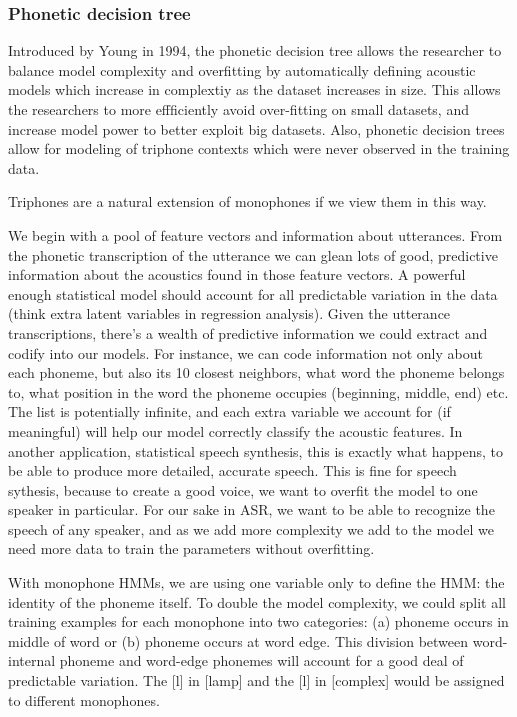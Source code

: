 \documentclass[10pt,a4paper]{article}
\begin{document}
\subsubsection*{Phonetic decision tree}
      
Introduced by Young in 1994, the phonetic decision tree allows the researcher to balance model complexity and overfitting by automatically defining acoustic models which increase in complextiy as the dataset increases in size. This allows the researchers to more effficiently avoid over-fitting on small datasets, and increase model power to better exploit big datasets. Also, phonetic decision trees allow for modeling of triphone contexts which were never observed in the training data.
    
Triphones are a natural extension of monophones if we view them in this way.

We begin with a pool of feature vectors and information about utterances. From the phonetic transcription of the utterance we can glean lots of good, predictive information about the acoustics found in those feature vectors. A powerful enough statistical model should account for all predictable variation in the data (think extra latent variables in regression analysis). Given the utterance transcriptions, there's a wealth of predictive information we could extract and codify into our models. For instance, we can code information not only about each phoneme, but also its 10 closest neighbors, what word the phoneme belongs to, what position in the word the phoneme occupies (beginning, middle, end) etc. The list is potentially infinite, and each extra variable we account for (if meaningful) will help our model correctly classify the acoustic features. In another application, statistical speech synthesis, this is exactly what happens, to be able to produce more detailed, accurate speech. This is fine for speech sythesis, because to create a good voice, we want to overfit the model to one speaker in particular. For our sake in ASR, we want to be able to recognize the speech of any speaker, and as we add more complexity we add to the model we need more data to train the parameters without overfitting.

With monophone HMMs, we are using one variable only to define the HMM: the identity of the phoneme itself. To double the model complexity, we could split all training examples for each monophone into two categories: (a) phoneme occurs in middle of word or (b) phoneme occurs at word edge. This division between word-internal phoneme and word-edge phonemes will account for a good deal of predictable variation. The [l] in [lamp] and the [l] in [complex] would be assigned to different monophones.
\end{document}
